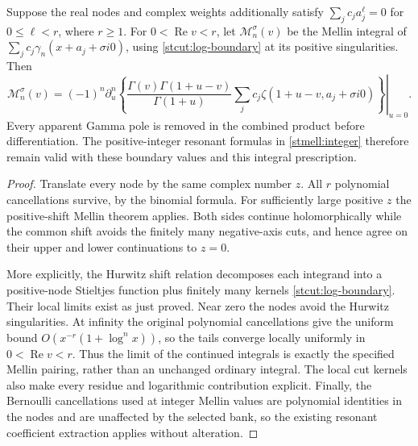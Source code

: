 \begin{theorem}
\label{stcut:Mellin}
Suppose the real nodes and complex weights additionally satisfy
$\sum_jc_ja_j^\ell=0$ for $0\le\ell<r$, where $r\ge1$.
For $0<\operatorname{Re}v<r$, let $\mathcal M_n^\sigma(v)$ be the
Mellin integral of $\sum_jc_j\gamma_n(x+a_j+\sigma i0)$, using
\eqref{stcut:log-boundary} at its positive singularities.
Then
\begin{equation}\label{stcut:Mellin-eq}
 \mathcal M_n^\sigma(v)=(-1)^n\left.\partial_u^n
 \left\{\frac{\Gamma(v)\Gamma(1+u-v)}{\Gamma(1+u)}
       \sum_jc_j\zeta(1+u-v,a_j+\sigma i0)\right\}\right|_{u=0}.
\end{equation}
Every apparent Gamma pole is removed in the combined product before
differentiation. The positive-integer resonant formulas in
\eqref{stmell:integer} therefore remain valid with these boundary
values and this integral prescription.
\end{theorem}
\begin{proof}
Translate every node by the same complex number $z$. All $r$
polynomial cancellations survive, by the binomial formula.
For sufficiently large positive $z$ the positive-shift Mellin theorem
applies. Both sides continue holomorphically while the common shift
avoids the finitely many negative-axis cuts, and hence agree on their
upper and lower continuations to $z=0$.

More explicitly, the Hurwitz shift relation decomposes each integrand
into a positive-node Stieltjes function plus finitely many kernels
\eqref{stcut:log-boundary}. Their local limits exist as just proved.
Near zero the nodes avoid the Hurwitz singularities. At infinity the
original polynomial cancellations give the uniform bound
$O(x^{-r}(1+\log^n x))$, so the tails converge locally uniformly in
$0<\operatorname{Re}v<r$. Thus the limit of the continued integrals
is exactly the specified Mellin pairing, rather than an unchanged
ordinary integral. The local cut kernels also make every residue and
logarithmic contribution explicit. Finally, the Bernoulli cancellations
used at integer Mellin values are polynomial identities in the nodes
and are unaffected by the selected bank, so the existing resonant
coefficient extraction applies without alteration.
\end{proof}

